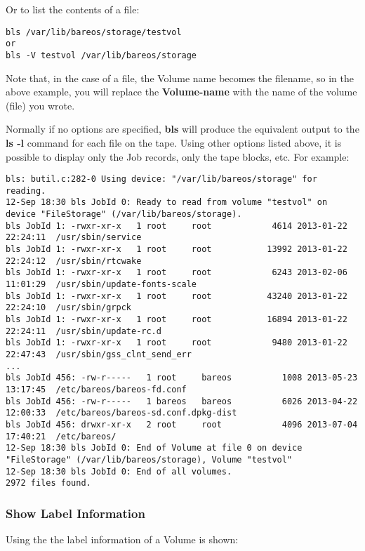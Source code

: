 Or to list the contents of a file:

\footnotesize
\begin{verbatim}
bls /var/lib/bareos/storage/testvol
or
bls -V testvol /var/lib/bareos/storage
\end{verbatim}
\normalsize

Note that, in the case of a file, the Volume name becomes the filename, so in
the above example, you will replace the {\bf Volume-name} with the name of the volume
(file) you wrote.

Normally if no options are specified, {\bf bls} will produce the equivalent
output to the {\bf ls -l} command for each file on the tape. Using other
options listed above, it is possible to display only the Job records, only the
tape blocks, etc. For example:

\footnotesize
\begin{verbatim}
bls: butil.c:282-0 Using device: "/var/lib/bareos/storage" for reading.
12-Sep 18:30 bls JobId 0: Ready to read from volume "testvol" on device "FileStorage" (/var/lib/bareos/storage).
bls JobId 1: -rwxr-xr-x   1 root     root            4614 2013-01-22 22:24:11  /usr/sbin/service
bls JobId 1: -rwxr-xr-x   1 root     root           13992 2013-01-22 22:24:12  /usr/sbin/rtcwake
bls JobId 1: -rwxr-xr-x   1 root     root            6243 2013-02-06 11:01:29  /usr/sbin/update-fonts-scale
bls JobId 1: -rwxr-xr-x   1 root     root           43240 2013-01-22 22:24:10  /usr/sbin/grpck
bls JobId 1: -rwxr-xr-x   1 root     root           16894 2013-01-22 22:24:11  /usr/sbin/update-rc.d
bls JobId 1: -rwxr-xr-x   1 root     root            9480 2013-01-22 22:47:43  /usr/sbin/gss_clnt_send_err
...
bls JobId 456: -rw-r-----   1 root     bareos          1008 2013-05-23 13:17:45  /etc/bareos/bareos-fd.conf
bls JobId 456: -rw-r-----   1 bareos   bareos          6026 2013-04-22 12:00:33  /etc/bareos/bareos-sd.conf.dpkg-dist
bls JobId 456: drwxr-xr-x   2 root     root            4096 2013-07-04 17:40:21  /etc/bareos/
12-Sep 18:30 bls JobId 0: End of Volume at file 0 on device "FileStorage" (/var/lib/bareos/storage), Volume "testvol"
12-Sep 18:30 bls JobId 0: End of all volumes.
2972 files found.
\end{verbatim}
\normalsize


\subsubsection{Show Label Information}

Using the  the label information of a Volume is shown:

